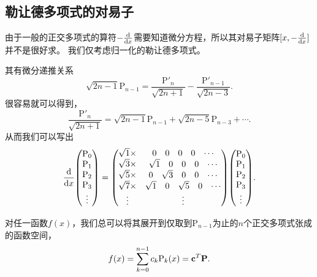 \documentclass[a4paper,unicode]{report}
\begin{document}
\subsection{勒让德多项式的对易子}
由于一般的正交多项式的算符$-\dv{x}$需要知道微分方程，所以其对易子矩阵$[x, -\dv{x}]$并不是很好求。
我们仅考虑归一化的勒让德多项式。

其有微分递推关系
\begin{equation}
    \sqrt{2n-1}\mathrm{P}_{n-1} = \frac{\mathrm{P}'_n}{\sqrt{2n+1}} - \frac{\mathrm{P}'_{n-1}}{\sqrt{2n-3}}.
\end{equation}
很容易就可以得到，
\begin{equation}
    \frac{\mathrm{P}'_n}{\sqrt{2n+1}} = \sqrt{2n-1}\mathrm{P}_{n-1} + \sqrt{2n-5}\mathrm{P}_{n-3} + \cdots.
\end{equation}
从而我们可以写出
\begin{equation}
    \dv{x} \mqty(
        \mathrm{P}_0\\   \mathrm{P}_1\\  \mathrm{P}_2\\    \mathrm{P}_3\\  \vdots
    )
    = \mqty(
        \sqrt{1}\times&\mqty{0&0&0&0&\cdots}\\
        \sqrt{3}\times&\mqty{\sqrt{1}&0&0&0&\cdots}\\
        \sqrt{5}\times&\mqty{0&\sqrt{3}&0&0&\cdots}\\
        \sqrt{7}\times&\mqty{\sqrt{1}&0&\sqrt{5}&0&\cdots}\\
        \vdots&\vdots\\
    ) \mqty(
        \mathrm{P}_0\\   \mathrm{P}_1\\  \mathrm{P}_2\\    \mathrm{P}_3\\  \vdots
    ).
\end{equation}

对任一函数$f(x)$，我们总可以将其展开到仅取到$\mathrm{P}_{n-1}$为止的$n$个正交多项式张成的函数空间，
\begin{equation}
    f(x) = \sum_{k=0}^{n-1} c_k \mathrm{P}_k(x) = \vb{c}^T\vb{P}.
\end{equation}
\end{document}
